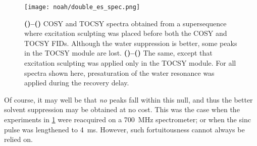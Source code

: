 \begin{figure}[!ht]
    \centering
    \texttt{[image: noah/double\_es\_spec.png]}%
    {\label{fig:double_es_spec_2es_c}}%
    {\label{fig:double_es_spec_2es_t}}%
    {\label{fig:double_es_spec_1es_c}}%
    {\label{fig:double_es_spec_1es_t}}%
    \caption[Spectra of CT modules using single and double excitation sculpting]{
        \textbf{()--()} COSY and TOCSY spectra obtained from a  supersequence where excitation sculpting was placed before both the COSY and TOCSY FIDs.
        Although the water suppression is better, some peaks in the TOCSY module are lost.
        \textbf{()--()} The same, except that excitation sculpting was applied only in the TOCSY module.
        For all spectra shown here, presaturation of the water resonance was applied during the recovery delay.
    }
    \label{fig:double_es_spec}
\end{figure}

Of course, it may well be that \textit{no} peaks fall within this null, and thus the better solvent suppression may be obtained at no cost.
This was the case when the experiments in \cref{fig:double_es_spec} were reacquired on a \qty{700}{\MHz} spectrometer; or when the sinc pulse was lengthened to \qty{4}{\ms}.
However, such fortuitousness cannot always be relied on.
